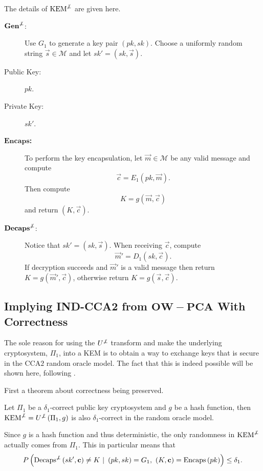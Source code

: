 The details of $\mathrm{KEM}^{\not\bot}$ are given here.
\begin{description}
	\item[$\mathrm{\mathbf{Gen}}^{\mathbf{\not\bot}}$:] Use $G_1$ to generate a key pair $\left(pk,sk\right)$. Choose a uniformly random string $\vec{s} \in \mathcal{M}$ and let $sk' = \left(sk, \vec{s}\right)$.
	\item[Public Key:] $pk$.
	\item[Private Key:] $sk'$.
	\item[$\mathbf{Encaps}$\textbf{:}] To perform the key encapsulation, let $\vec{m} \in \mathcal{M}$ be any valid message and compute
		\[
			\vec{c} = E_1\left(pk,\vec{m}\right).
		\]
		Then compute
		\[
			K = g\left(\vec{m}, \vec{c}\right)
		\]
		and return $\left(K, \vec{c}\right)$.
	\item[$\mathbf{Decaps}^{\mathbf{\not\bot}}$:] Notice that $sk' = \left(sk, \vec{s}\right)$. When receiving $\vec{c}$, compute
		\[
			\vec{m}' = D_1\left(sk, \vec{c}\right).
		\]
		If decryption succeeds and $\vec{m}'$ is a valid message then return $K = g\left(\vec{m}', \vec{c}\right)$, otherwise return $K = g\left(\vec{s}, \vec{c}\right)$.
\end{description}




\subsection{Implying IND-CCA2 from $\mathbf{OW-PCA}$ With Correctness}
\label{subsec:impCCAFromPCA}

The sole reason for using the $U^{\not\bot}$ transform and make the underlying cryptosystem, $\Pi_1$, into a KEM is to obtain a way to exchange keys that is secure in the $\mathrm{CCA}2$ random oracle model. The fact that this is indeed possible will be shown here, following \cite{HHK}.

First a theorem about correctness being preserved.
\begin{thm}
\label{thm:corrOfUofTofPi}
	Let $\Pi_1$ be a $\delta_1$-correct public key cryptosystem and $g$ be a hash function, then $\mathrm{KEM}^{\not\bot} = U^{\not\bot}\left(\Pi_1, g\right)$ is also $\delta_1$-correct in the random oracle model.
\begin{Proof}
	Since $g$ is a hash function and thus deterministic, the only randomness in $\mathrm{KEM}^{\not\bot}$ actually comes from $\Pi_1$. This in particular means that
	\[
		P\left(\mathrm{Decaps}^{\not\bot}\left(sk',\vec{c}\right) \neq K \ \vert \ \left(pk,sk\right) = G_1, \ \left(K,\vec{c}\right) = \mathrm{Encaps}\left(pk\right)\right) \leq \delta_1.
	\]
\end{Proof}
\end{thm}

